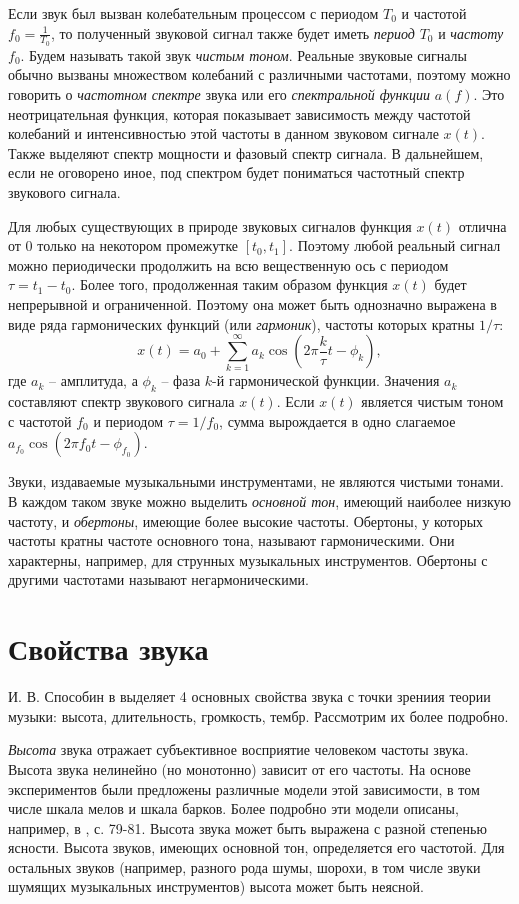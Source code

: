 Если звук был вызван колебательным процессом с периодом $T_0$ и частотой $f_0 =
\frac{1}{T_0}$, то полученный звуковой сигнал также будет иметь \emph{период}
$T_0$ и \emph{частоту} $f_0$. Будем называть такой звук \emph{чистым тоном}.
Реальные звуковые сигналы обычно вызваны множеством колебаний с различными
частотами, поэтому можно говорить о \emph{частотном спектре} звука или его
\emph{спектральной функции} $a(f)$. Это неотрицательная функция,
которая показывает зависимость между частотой колебаний и интенсивностью этой
частоты в данном звуковом сигнале $x(t)$. Также выделяют спектр мощности и
фазовый спектр сигнала. В дальнейшем, если не оговорено иное, под спектром будет
пониматься частотный спектр звукового сигнала.

Для любых существующих в природе звуковых сигналов функция $x(t)$ отлична от 0
только на некотором промежутке $[t_0, t_1]$. Поэтому любой реальный сигнал можно
периодически продолжить на всю вещественную ось с периодом $\tau = t_1 - t_0$.
Более того, продолженная таким образом функция $x(t)$ будет непрерывной и
ограниченной. Поэтому она может быть однозначно выражена в виде ряда
гармонических функций (или \emph{гармоник}), частоты которых кратны $1 / \tau$:
$$x(t) = a_0 + \sum_{k=1}^\infty a_k \cos \left(2\pi \frac{k}{\tau} t -
\phi_k \right),$$ где $a_k$ -- амплитуда, а $\phi_k$ -- фаза $k$-й гармонической
функции. Значения $a_k$ составляют спектр звукового сигнала $x(t)$. Если $x(t)$
является чистым тоном с частотой $f_0$ и периодом $\tau = 1/f_0$, сумма
вырождается в одно слагаемое $a_{f_0} \cos(2 \pi f_0 t - \phi_{f_0})$.

Звуки, издаваемые музыкальными инструментами, не являются чистыми тонами. В
каждом таком звуке можно выделить \emph{основной тон}, имеющий наиболее низкую
частоту, и \emph{обертоны}, имеющие более высокие частоты. Обертоны, у которых
частоты кратны частоте основного тона, называют гармоническими. Они
характерны, например, для струнных музыкальных инструментов. Обертоны с другими
частотами называют негармоническими.

\section{Свойства звука} \label{sectT_prop}

И. В. Способин в \cite{Sposobin2012} выделяет 4 основных свойства звука с точки
зрениия теории музыки: высота, длительность, громкость, тембр. Рассмотрим их
более подробно.

\emph{Высота} звука отражает субъективное восприятие человеком частоты звука.
Высота звука нелинейно (но монотонно) зависит от его частоты. На основе
экспериментов были предложены различные модели этой зависимости, в том числе
шкала мелов и шкала барков. Более подробно эти модели описаны, например, в
\cite{Lerch2012}, с. 79-81. Высота звука может быть выражена с разной степенью
ясности. Высота звуков, имеющих основной тон, определяется его частотой. Для
остальных звуков (например, разного рода шумы, шорохи, в том числе звуки шумящих
музыкальных инструментов) высота может быть неясной.

